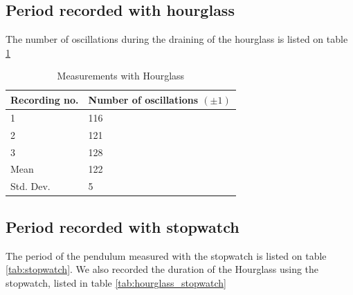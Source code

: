 \documentclass[%
 reprint,
 amsmath,amssymb,
 aps,
]{revtex4-1}
\begin{document}
	\subsection{Period recorded with hourglass}

        The number of oscillations during the draining of the hourglass is listed on table \ref{tab:hourglass}

    	\begin{table}[h] %
            \center
            \caption{Measurements with Hourglass}
            \label{tab:hourglass}
            \begin{tabular}{| l | l |}
                \hline
                Recording no. & Number of oscillations $(\pm 1)$\\ \hline
                1 & 116 \\ \hline
                2 & 121 \\ \hline
                3 & 128 \\ \hline
                \hline
                Mean & 122 \\ \hline
                Std. Dev. & 5 \\\hline
            \end{tabular}
    	\end{table}

	\subsection{Period recorded with stopwatch}

        The period of the pendulum measured with the stopwatch is listed on table \ref{tab:stopwatch}.
        We also recorded the duration of the Hourglass using the stopwatch, listed in table \ref{tab:hourglass_stopwatch}
\end{document}

